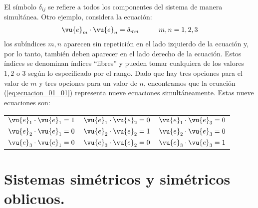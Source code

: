 El símbolo $\delta_{ij}$ se refiere a todos los componentes del sistema de manera simultánea. Otro ejemplo, considera la ecuación:
\begin{align}
\vu{e}_{m} \cdot \vu{e}_{n} = \delta_{mn} \hspace{1cm} m, n = 1, 2, 3
\label{eq:ecuacion_01_01}
\end{align}
los subíndices $m, n$ aparecen sin repetición en el lado izquierdo de la ecuación y, por lo tanto, también deben aparecer en el lado derecho de la ecuación. Estos índices se denominan índices \enquote{libres} y pueden tomar cualquiera de los valores $1, 2$ o $3$ según lo especificado por el rango. Dado que hay tres opciones para el valor de $m$ y tres opciones para un valor de $n$, encontramos que la ecuación (\ref{eq:ecuacion_01_01}) representa nueve ecuaciones simultáneamente. Estas nueve ecuaciones son:
\begin{table}[H]
\centering
\begin{tabular}{c c c}
$\vu{e}_{1} \cdot \vu{e}_{1} = 1$ & $\vu{e}_{1} \cdot \vu{e}_{2} = 0$ & $\vu{e}_{1} \cdot \vu{e}_{3} = 0$ \\
$\vu{e}_{2} \cdot \vu{e}_{1} = 0$ & $\vu{e}_{2} \cdot \vu{e}_{2} = 1$ & $\vu{e}_{2} \cdot \vu{e}_{3} = 0$ \\
$\vu{e}_{3} \cdot \vu{e}_{1} = 0$ & $\vu{e}_{3} \cdot \vu{e}_{2} = 0$ & $\vu{e}_{3} \cdot \vu{e}_{3} = 1$
\end{tabular}
\end{table}
\section{Sistemas simétricos y simétricos oblicuos.}
